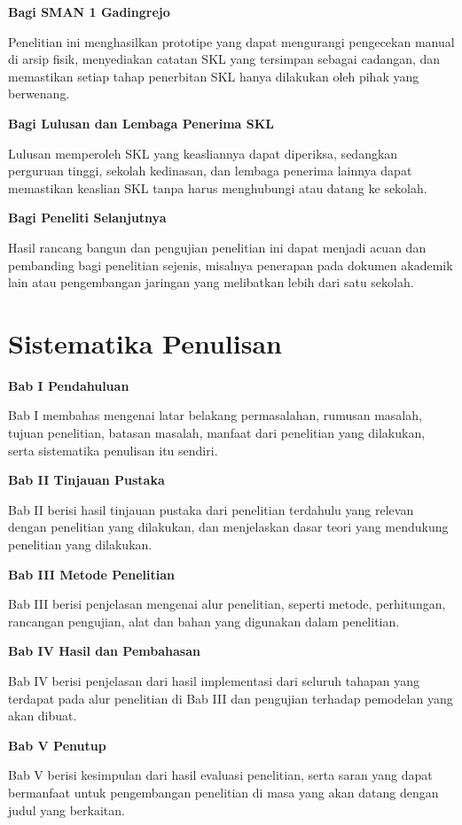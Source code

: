 \textbf{Bagi SMAN 1 Gadingrejo}

Penelitian ini menghasilkan prototipe yang dapat mengurangi pengecekan manual di arsip fisik, menyediakan catatan SKL yang tersimpan sebagai cadangan, dan memastikan setiap tahap penerbitan SKL hanya dilakukan oleh pihak yang berwenang.\par

\textbf{Bagi Lulusan dan Lembaga Penerima SKL}

Lulusan memperoleh SKL yang keasliannya dapat diperiksa, sedangkan perguruan tinggi, sekolah kedinasan, dan lembaga penerima lainnya dapat memastikan keaslian SKL tanpa harus menghubungi atau datang ke sekolah.\par

\textbf{Bagi Peneliti Selanjutnya}

Hasil rancang bangun dan pengujian penelitian ini dapat menjadi acuan dan pembanding bagi penelitian sejenis, misalnya penerapan pada dokumen akademik lain atau pengembangan jaringan yang melibatkan lebih dari satu sekolah.\par

\section{Sistematika Penulisan}

\textbf{Bab I Pendahuluan}

Bab I membahas mengenai latar belakang permasalahan, rumusan masalah, tujuan penelitian, batasan masalah, manfaat dari penelitian yang dilakukan, serta sistematika penulisan itu sendiri.\par

\textbf{Bab II Tinjauan Pustaka}

Bab II berisi hasil tinjauan pustaka dari penelitian terdahulu yang relevan dengan penelitian yang dilakukan, dan menjelaskan dasar teori yang mendukung penelitian yang dilakukan.\par

\textbf{Bab III Metode Penelitian}

Bab III berisi penjelasan mengenai alur penelitian, seperti metode, perhitungan, rancangan pengujian, alat dan bahan yang digunakan dalam penelitian.\par

\textbf{Bab IV Hasil dan Pembahasan}

Bab IV berisi penjelasan dari hasil implementasi dari seluruh tahapan yang terdapat pada alur penelitian di Bab III dan pengujian terhadap pemodelan yang akan dibuat.\par

\textbf{Bab V Penutup}

Bab V berisi kesimpulan dari hasil evaluasi penelitian, serta saran yang dapat bermanfaat untuk pengembangan penelitian di masa yang akan datang dengan judul yang berkaitan.\par